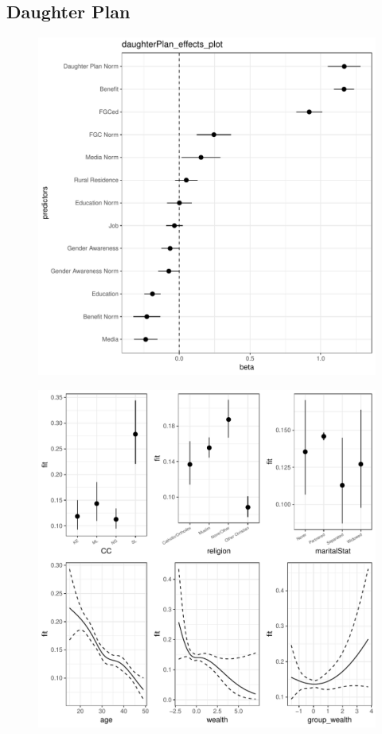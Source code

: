 \documentclass[12pt,]{article}
\begin{document}
\subsection{Daughter Plan}
\begin{center}
\begin{figure}[h!]
\includegraphics[scale=0.7]{./git_push/daughterPlan_effects_plot.Rout.pdf}
\end{figure}
\end{center}

\begin{center}
\begin{figure}[h!]
\includegraphics[scale=0.7]{./git_push/daughterPlan_isoplots.Rout.pdf}
\end{figure}
\end{center}
\end{document}
